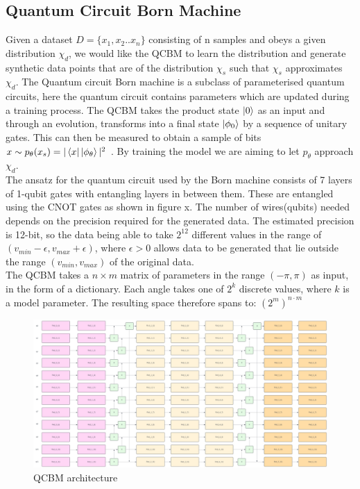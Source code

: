 \documentclass[12pt]{article}
\numberwithin{equation}{section}
\begin{document}
\subsection{Quantum Circuit Born Machine}
Given a dataset $D = \{x_1, x_2.. x_n\}$ consisting of n samples and obeys a 
given distribution $\chi_d$, we would like the QCBM to learn the distribution 
and generate synthetic data points that are of the distribution $\chi_s$ such that
$\chi_s$ approximates $\chi_d$.
The Quantum circuit Born machine is a subclass of parameterised quantum circuits, 
here the quantum circuit contains parameters which are updated during a training 
process. The QCBM takes the product state $\ket{0}$ as an input and through an 
evolution, transforms into a final state $\ket{\phi_0}$ by a sequence of unitary 
gates. This can then be measured to obtain a sample of bits 
$x \sim p_\theta (x_s)=|\bra{x}\ket{\phi_\theta}|^2$ . By training the model we 
are aiming to let $p_\theta$ approach $\chi_d$. 
\\
The ansatz for the quantum circuit used by the Born machine consists of 7 layers
of 1-qubit gates with entangling layers in between them. These are 
entangled using the CNOT gates as shown in figure x. The number of wires(qubits) 
needed depends on the precision required for the generated data. The estimated
precision is 12-bit, so the data being able to take $2^{12}$ different values in 
the range of $ (v_{min} - \epsilon, v_{max} + \epsilon )$, where $\epsilon > 0 $
allows data to be generated that lie outside the range $(v_{min},v_{max})$ of the 
original data.
\\
The QCBM takes a $n \times m$ matrix of parameters in the range $(-\pi, \pi)$ as 
input, in the form of a dictionary. Each angle takes one of $2^k$ discrete values, 
where $k$ is a model parameter. The resulting space therefore spans to: 
$(2^m)^{n\cdot m}$
\begin{figure}[h]
    \centering
    \includegraphics[scale=0.5]{qcbm1.png}
    \caption{QCBM architecture}
\end{figure}
\end{document}
